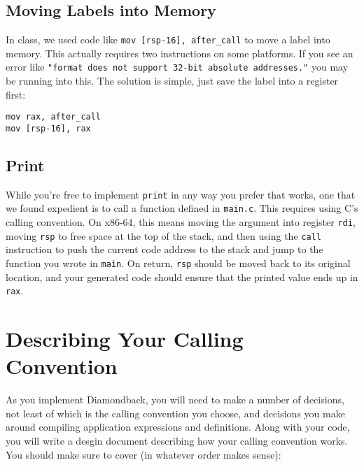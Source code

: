 \documentclass[10pt, oneside]{article}
\begin{document}
\subsection*{Moving Labels into Memory}

In class, we used code like {\tt mov [rsp-16], after\_call} to move a label
into memory. This actually requires two instructions on some platforms. If
you see an error like {\tt "format does not support 32-bit absolute
addresses."} you may be running into this. The solution is simple, just save
the label into a register first:

\begin{lstlisting}
mov rax, after_call
mov [rsp-16], rax
\end{lstlisting}

\subsection*{Print}

While you're free to implement {\tt print} in any way you prefer that works,
one that we found expedient is to call a function defined in {\tt main.c}.
This requires using C's calling convention. On x86-64, this means moving the
argument into register {\tt rdi}, moving {\tt rsp} to free space at the top
of the stack, and then using the {\tt call} instruction to push the current
code address to the stack and jump to the function you wrote in {\tt main}.
On return, {\tt rsp} should be moved back to its original location, and your
generated code should ensure that the printed value ends up in {\tt rax}.

\section*{Describing Your Calling Convention}

As you implement Diamondback, you will need to make a number of decisions,
not least of which is the calling convention you choose, and decisions you
make around compiling application expressions and definitions. Along with
your code, you will write a desgin document describing how your calling
convention works. You should make sure to cover (in whatever order makes
sense):
\end{document}
